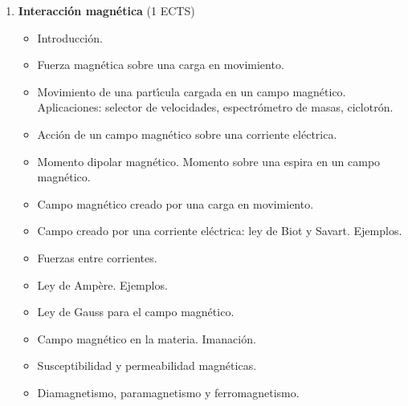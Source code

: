 \begin{enumerate}[{\bf 1. }]
\item {\bf Interacci\'{o}n magn\'{e}tica} \hfill (1 ECTS) 
\begin{itemize} \addtolength{\itemsep}{-0.25\baselineskip}
\noindent
\item    Introducci\'{o}n.
\item  Fuerza magn\'{e}tica sobre una carga en movimiento.
\item  Movimiento de una part\'{\i}cula cargada en un campo magn\'{e}tico. 
Aplicaciones: selector de velocidades, espectr\'{o}metro de masas, ciclotr\'{o}n.
\item  Acci\'{o}n de un campo magn\'{e}tico sobre una corriente el\'{e}ctrica.
\item  Momento dipolar  magn\'{e}tico. Momento sobre una espira en un campo magn\'{e}tico.
\item  Campo magn\'{e}tico creado por una carga en movimiento.
\item  Campo creado por una corriente el\'{e}ctrica: ley de Biot y Savart. Ejemplos.
\item  Fuerzas entre corrientes.
\item  Ley de Amp\`{e}re. Ejemplos.
\item  Ley de Gauss para el campo magn\'{e}tico.
\item Campo magn\'{e}tico en la materia.  Imanaci\'{o}n.
\item Susceptibilidad y permeabilidad magn\'{e}ticas.
\item Diamagnetismo, paramagnetismo y ferromagnetismo.
\end{itemize}



\end{enumerate}
